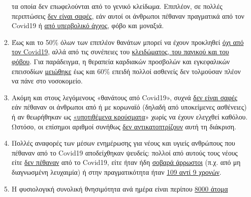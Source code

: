 \begin{enumerate}
  τα οποία δεν επωφελούνται από το γενικό κλείδωμα. Επιπλέον, σε πολλές
  περιπτώσεις
  \href{https://www.hsj.co.uk/commissioning/thousands-of-extra-deaths-outside-hospital-not-attributed-to-covid-19/7027459.article}{δεν
  είναι σαφές}, εάν αυτοί οι άνθρωποι πέθαναν πραγματικά από τον Covid19
  ή
  \href{https://www.nytimes.com/2020/04/16/world/canada/montreal-nursing-homes-coronavirus.html}{από
  υπερβολικό άγχος}, φόβο και μοναξιά.
\item
  Έως και το 50\% όλων των επιπλέον θανάτων μπορεί να έχουν προκληθεί
  \href{https://www.thetimes.co.uk/edition/news/coronavirus-record-weekly-death-toll-as-fearful-patients-avoid-hospitals-bm73s2tw3}{όχι
  από τον Covid19}, αλλά από τις συνέπειες του
  \href{https://www.telegraph.co.uk/global-health/science-and-disease/two-new-waves-deaths-break-nhs-new-analysis-warns/}{κλειδώματος,
  του πανικού και του φόβου}. Για παράδειγμα, η θεραπεία καρδιακών
  προσβολών και εγκεφαλικών επεισοδίων
  \href{https://www.nytimes.com/2020/04/06/well/live/coronavirus-doctors-hospitals-emergency-care-heart-attack-stroke.html}{μειώθηκε}
  έως και 60\% επειδή πολλοί ασθενείς δεν τολμούσαν πλέον να πάνε στο
  νοσοκομείο.
\item
  Ακόμη και στους λεγόμενους «θανάτους από Covid19», συχνά
  \href{https://spectator.us/understand-report-figures-covid-deaths/}{δεν
  είναι σαφές} εάν πέθαναν οι άνθρωποι από ή με κορωναϊό (δηλαδή από
  υποκείμενες ασθένειες) ή αν θεωρήθηκαν ως
  \href{https://www.youtube.com/watch?v=V0lIWZpiRU0}{«υποτιθέμενα
  κρούσματα}» χωρίς να έχουν ελεγχθεί καθόλου. Ωστόσο, οι επίσημοι
  αριθμοί συνήθως
  \href{https://www.hsj.co.uk/coronavirus/systematic-reviews-to-discover-true-cause-of-outbreak-deaths/7027491.article}{δεν
  αντικατοπτρίζουν} αυτή τη διάκριση.
\item
  Πολλές αναφορές των μέσων ενημέρωσης για νέους και υγιείς ανθρώπους
  που πέθαναν από το Covid19 αποδείχθηκαν ψευδείς: πολλοί από αυτούς
  τους νέους είτε
  \href{https://www.hsj.co.uk/coronavirus/systematic-reviews-to-discover-true-cause-of-outbreak-deaths/7027491.article}{δεν
  πέθαναν} από το Covid19, είτε ήταν ήδη
  \href{https://sports.yahoo.com/spanish-football-coach-francisco-garcia-163153573.html}{σοβαρά
  άρρωστοι} (π.χ. από μη διαγνωσμένη λευχαιμία) ή στην πραγματικότητα
  ήταν
  \href{https://www.tagesanzeiger.ch/bund-muss-in-seiner-todesfallstatistik-fehler-korrigieren-584308129723}{109
  αντί 9 χρονών}.
\item
  Η φυσιολογική συνολική θνησιμότητα ανά ημέρα είναι περίπου
  \href{https://www.cdc.gov/mmwr/volumes/68/wr/mm6826a5.htm}{8000 άτομα}

\end{enumerate}
